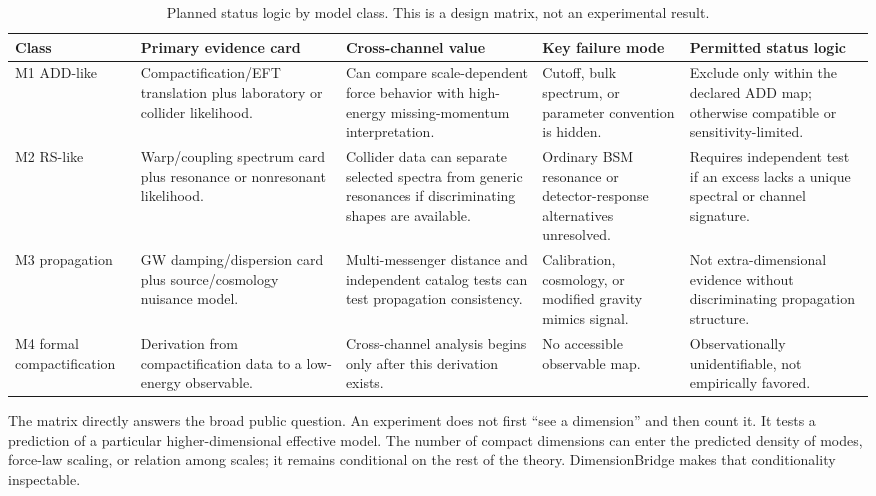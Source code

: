 \documentclass[conference]{IEEEtran}
\begin{document}
\begin{table}[t]
\caption{Planned status logic by model class. This is a design matrix, not an experimental result.}
\label{tab:matrix}
\centering
\footnotesize
\setlength{\tabcolsep}{2.2pt}
\begin{tabular}{p{} p{} p{} p{} p{}}
\toprule
\textbf{Class} & \textbf{Primary evidence card} & \textbf{Cross-channel value} & \textbf{Key failure mode} & \textbf{Permitted status logic} \\
\midrule
M1 ADD-like & Compactification/EFT translation plus laboratory or collider likelihood. & Can compare scale-dependent force behavior with high-energy missing-momentum interpretation. & Cutoff, bulk spectrum, or parameter convention is hidden. & Exclude only within the declared ADD map; otherwise compatible or sensitivity-limited. \\
M2 RS-like & Warp/coupling spectrum card plus resonance or nonresonant likelihood. & Collider data can separate selected spectra from generic resonances if discriminating shapes are available. & Ordinary BSM resonance or detector-response alternatives unresolved. & Requires independent test if an excess lacks a unique spectral or channel signature. \\
M3 propagation & GW damping/dispersion card plus source/cosmology nuisance model. & Multi-messenger distance and independent catalog tests can test propagation consistency. & Calibration, cosmology, or modified gravity mimics signal. & Not extra-dimensional evidence without discriminating propagation structure. \\
M4 formal compactification & Derivation from compactification data to a low-energy observable. & Cross-channel analysis begins only after this derivation exists. & No accessible observable map. & Observationally unidentifiable, not empirically favored. \\
\bottomrule
\end{tabular}
\end{table}

The matrix directly answers the broad public question. An experiment does not first ``see a dimension'' and then count it. It tests a prediction of a particular higher-dimensional effective model. The number of compact dimensions can enter the predicted density of modes, force-law scaling, or relation among scales; it remains conditional on the rest of the theory. DimensionBridge makes that conditionality inspectable.
\end{document}
